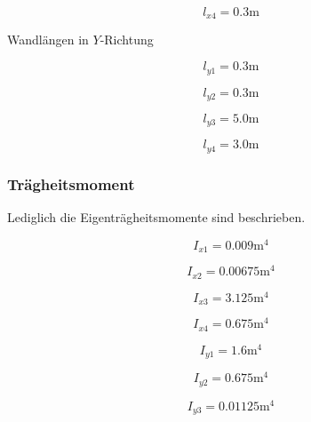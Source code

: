 \documentclass[
  letterpaper,
  DIV=11]{scrreprt}
\begin{document}
\begin{equation*}l_{x4} = 0.3 \text{m}\end{equation*}

Wandlängen in \(Y\)-Richtung

\begin{equation*}l_{y1} = 0.3 \text{m}\end{equation*}

\begin{equation*}l_{y2} = 0.3 \text{m}\end{equation*}

\begin{equation*}l_{y3} = 5.0 \text{m}\end{equation*}

\begin{equation*}l_{y4} = 3.0 \text{m}\end{equation*}

\hypertarget{truxe4gheitsmoment}{%
\subsubsection{Trägheitsmoment}\label{truxe4gheitsmoment}}

Lediglich die Eigenträgheitsmomente sind beschrieben.

\begin{equation*}I_{x1} = 0.009 \text{m}^{4}\end{equation*}

\begin{equation*}I_{x2} = 0.00675 \text{m}^{4}\end{equation*}

\begin{equation*}I_{x3} = 3.125 \text{m}^{4}\end{equation*}

\begin{equation*}I_{x4} = 0.675 \text{m}^{4}\end{equation*}

\begin{equation*}I_{y1} = 1.6 \text{m}^{4}\end{equation*}

\begin{equation*}I_{y2} = 0.675 \text{m}^{4}\end{equation*}

\begin{equation*}I_{y3} = 0.01125 \text{m}^{4}\end{equation*}
\end{document}
